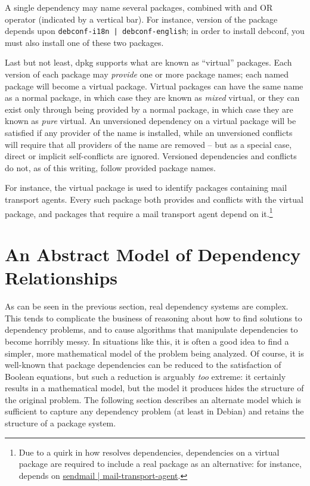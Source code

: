 \documentclass[letterpaper]{article}
\theoremstyle{definition}
\theoremstyle{remark}
\newcommand{\pkg}[1]{\text{\url{#1}}}
\begin{document}
A single dependency may name several packages, combined with and OR
operator (indicated by a vertical bar).  For instance, version
\pkg{1.4.48} of the \pkg{debconf} package depends upon
\verb!debconf-i18n | debconf-english!; in order to install debconf,
you must also install one of these two packages.

Last but not least, dpkg supports what are known as ``virtual''
packages.  Each version of each package may \emph{provide} one or more
package names; each named package will become a virtual package.
Virtual packages can have the same name as a normal package, in which
case they are known as \emph{mixed} virtual, or they can exist only
through being provided by a normal package, in which case they are
known as \emph{pure} virtual.  An unversioned dependency on a virtual
package will be satisfied if any provider of the name is installed,
while an unversioned conflicts will require that all providers of the
name are removed -- but as a special case, direct or implicit
self-conflicts are ignored.  Versioned dependencies and conflicts do
not, as of this writing, follow provided package names.

For instance, the virtual package \pkg{mail-transport-agent} is used
to identify packages containing mail transport agents.  Every such
package both provides and conflicts with the virtual package, and
packages that require a mail transport agent depend on
it.\footnote{Due to a quirk in how \pkg{apt} resolves dependencies,
  dependencies on a virtual package are required to include a real
  package as an alternative: for instance, \pkg{bugzilla} depends on
  \url{sendmail | mail-transport-agent}.}

\section{An Abstract Model of Dependency Relationships}

As can be seen in the previous section, real dependency systems are
complex.  This tends to complicate the business of reasoning about how
to find solutions to dependency problems, and to cause algorithms that
manipulate dependencies to become horribly messy.  In situations like
this, it is often a good idea to find a simpler, more mathematical
model of the problem being analyzed.  Of course, it is well-known that
package dependencies can be reduced to the satisfaction of Boolean
equations, but such a reduction is arguably \emph{too} extreme: it
certainly results in a mathematical model, but the model it produces
hides the structure of the original problem.  The following section
describes an alternate model which is sufficient to capture any
dependency problem (at least in Debian) and retains the structure of a
package system.
\end{document}
